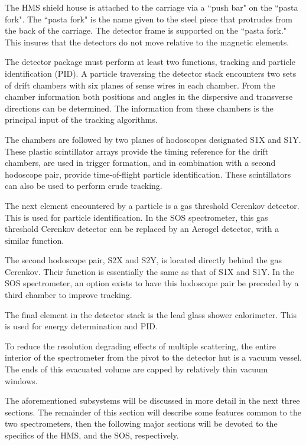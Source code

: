 The HMS shield house is attached to the carriage via a ``push bar" on the ``pasta
fork".  The ``pasta fork" is the name given to the steel piece that protrudes
from the back of the carriage. The detector frame is supported on the
``pasta fork." This insures that the detectors do not move relative
to the magnetic elements.

The detector package must perform at least two functions, tracking and
particle identification (PID). A particle traversing the detector stack
encounters two sets of drift chambers with six planes of sense
wires in each chamber. From the chamber information both positions
and angles in the dispersive and transverse directions can be determined.
The information from these chambers is the principal input
of the tracking algorithms.

The chambers are followed by two planes of hodoscopes designated S1X and S1Y.
These plastic scintillator arrays provide the timing reference for the
drift chambers, are used in trigger formation, and in combination
with a second hodoscope pair, provide time-of-flight particle identification.
These scintillators can also be used to perform crude tracking.

The next element encountered by a particle is a gas threshold Cerenkov detector.
This is used for particle identification. In the SOS spectrometer, this
gas threshold Cerenkov detector can be replaced by an Aerogel detector,
with a similar function.

The second hodoscope pair, S2X and S2Y, is located directly behind the
gas Cerenkov. Their function is essentially the same as that of S1X and S1Y.
In the SOS spectrometer, an option exists to have this hodoscope pair
be preceded by a third chamber to improve tracking.

The final element in the detector stack is the lead glass shower calorimeter.
This is used for energy determination and PID.
	
To reduce the resolution degrading effects of multiple scattering, the entire
interior of the spectrometer from the pivot to the detector hut is a vacuum
vessel. The ends of this evacuated
volume are capped by relatively thin vacuum windows.

The aforementioned subsystems will be discussed in more detail in the next three
sections. The remainder of this section will describe some features common to
the two spectrometers, then the following major sections will be devoted to the specifics 
of the HMS, and the SOS, respectively.

